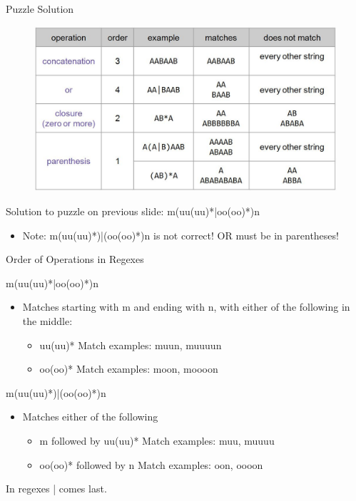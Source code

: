 \documentclass[aspectratio=169]{../latex_main/tntbeamer}  %
\begin{document}
	\begin{frame}{Puzzle Solution}
 

        \begin{figure}
	        \centering
	        \includegraphics[scale=.35]{Bild10}
	    \end{figure}
	    Solution to puzzle on previous slide: m(uu(uu)*|oo(oo)*)n
        \begin{itemize}
            \item Note: m(uu(uu)*)|(oo(oo)*)n is not correct! OR must be in parentheses!
        \end{itemize}

	\end{frame}
	
	
	
	\begin{frame}{Order of Operations in Regexes}
 
        m(uu(uu)*|oo(oo)*)n
        \begin{itemize}
            \item Matches starting with m and ending with n, with either of the following in the middle:
            \begin{itemize}
                \item uu(uu)* \hspace{3cm} Match examples: muun, muuuun
                \item oo(oo)*  \hspace{3cm} Match examples: moon, moooon  
            \end{itemize}
        \end{itemize}
        \pause
        m(uu(uu)*)|(oo(oo)*)n\\
        \bigskip
        \begin{itemize}
            \item Matches either of the following
            \begin{itemize}
                \item m followed by uu(uu)*  \hspace{3cm} Match examples: muu, muuuu
                \item oo(oo)* followed by n  \hspace{3cm} Match examples: oon, oooon  
            \end{itemize}
        \end{itemize}
        \bigskip
        In regexes | comes last.

	\end{frame}
\end{document}
